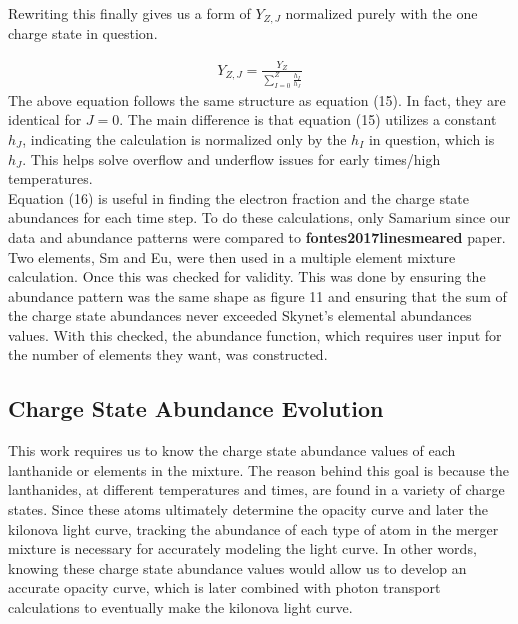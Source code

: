 \documentclass[11pt,a4paper]{article}
\begin{document}
Rewriting this finally gives us a form of $Y_{Z,J}$ normalized purely with the one charge state in question. 

\begin{align}
Y_{Z,J} = \frac{Y_Z}{\displaystyle \sum_{I=0}^{Z} \frac{h_I}{h_J}}
\end{align} 
The above equation follows the same structure as equation (15). In fact, they are identical for $J=$0. The main difference is that equation (15) utilizes a constant $h_J$, indicating the calculation is normalized only by the $h_I$ in question, which is $h_J$. This helps solve overflow and underflow issues for early times/high temperatures. \\

Equation (16) is useful in finding the electron fraction and the charge state abundances for each time step. To do these calculations, only Samarium since our data and abundance patterns were compared to \textbf{fontes2017linesmeared} paper. Two elements, Sm and Eu, were then used in a multiple element mixture calculation. Once this was checked for validity. This was done by ensuring the abundance pattern was the same shape as figure 11 and ensuring that the sum of the charge state abundances never exceeded Skynet's elemental abundances values. With this checked, the abundance function, which requires user input for the number of elements they want, was constructed. 




\subsection{Charge State Abundance Evolution}

\indent This work requires us to know the charge state abundance values of each lanthanide or elements in the mixture. The reason behind this goal is because the lanthanides, at different temperatures and times, are found in a variety of charge states. Since these atoms ultimately determine the opacity curve and later the kilonova light curve, tracking the abundance of each type of atom in the merger mixture is necessary for accurately modeling the light curve. In other words, knowing these charge state abundance values would allow us to develop an accurate opacity curve, which is later combined with photon transport calculations to eventually make the kilonova light curve.\\ 
\end{document}
